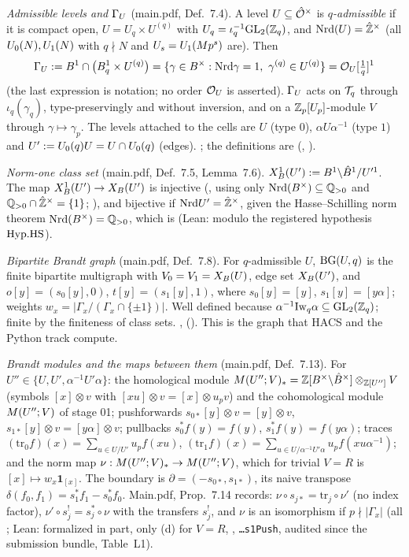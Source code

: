 \emph{Admissible levels and $\Gamma_U$} (main.pdf, Def.~7.4). A level $U\subseteq\hat{\mathcal{O}}^\times$ is \emph{$q$-admissible} if it is
compact open, $U=U_q\times U^{(q)}$ with $U_q=\iota_q^{-1}\mathrm{GL}_2(\mathbb{Z}_q)$, and $\mathrm{Nrd}(U)=\hat{\mathbb{Z}}^\times$ (all $U_0(N),U_1(N)$ with $q\nmid N$ and
$U_s=U_1(Mp^s)$ are). Then
\[\Gamma_U:=B^1\cap\big(B^1_q\times U^{(q)}\big)=\{\gamma\in B^\times:\mathrm{Nrd}\gamma=1,\ \gamma^{(q)}\in U^{(q)}\}=\mathcal{O}_U[\tfrac1q]^1\]
(the last expression is notation; no order $\mathcal{O}_U$ is asserted). $\Gamma_U$ acts on $\mathcal{T}_q$ through $\iota_q(\gamma_q)$, type-preservingly
and without inversion, and on a $\mathbb{Z}_p[U_p]$-module $V$ through $\gamma\mapsto\gamma_p$. The levels attached to the cells are $U$
(type $0$), $\alpha U\alpha^{-1}$ (type $1$) and $U':=U_0(q)U=U\cap U_0(q)$ (edges). \stproved; the definitions are \stformal{}
(, ).

\emph{Norm-one class set} (main.pdf, Def.~7.5, Lemma~7.6). $X^1_B(U'):=B^1\backslash\hat{B}^1/U'^1$. The map $X^1_B(U')\to X_B(U')$ is
injective (\stproved, using only $\mathrm{Nrd}(B^\times)\subseteq\mathbb{Q}_{>0}$ and $\mathbb{Q}_{>0}\cap\hat{\mathbb{Z}}^\times=\{1\}$; \stformal), and bijective if
$\mathrm{Nrd} U'=\hat{\mathbb{Z}}^\times$, given the Hasse--Schilling norm theorem $\mathrm{Nrd}(B^\times)=\mathbb{Q}_{>0}$, which is \stcited{}
\cite[Main Thm.~14.7.4, p.~234]{Vo} (Lean: \stformal{} modulo the registered hypothesis $\mathrm{Hyp.HS}$).

\emph{Bipartite Brandt graph} (main.pdf, Def.~7.8). For $q$-admissible $U$, $\mathrm{BG}(U,q)$ is the finite bipartite multigraph with
$V_0=V_1=X_B(U)$, edge set $X_B(U')$, and $o[y]=(s_0[y],0)$, $t[y]=(s_1[y],1)$, where $s_0[y]=[y]$, $s_1[y]=[y\alpha]$; weights
$w_x=|\Gamma_x/(\Gamma_x\cap\{\pm1\})|$. Well defined because $\alpha^{-1}\mathrm{Iw}_q\alpha\subseteq\mathrm{GL}_2(\mathbb{Z}_q)$; finite by the finiteness of class sets.
\stproved, \stformal{} (). This is the graph that HACS and the Python track compute.

\emph{Brandt modules and the maps between them} (main.pdf, Def.~7.13). For $U''\in\{U,U',\alpha^{-1}U'\alpha\}$:
the homological module $M(U'';V)_*=\mathbb{Z}[B^\times\backslash\hat{B}^\times]\otimes_{\mathbb{Z}[U'']}V$ (symbols $[x]\otimes v$ with $[xu]\otimes v=[x]\otimes u_pv$) and
the cohomological module $M(U'';V)$ of stage 01; pushforwards $s_{0*}[y]\otimes v=[y]\otimes v$, $s_{1*}[y]\otimes v=[y\alpha]\otimes v$;
pullbacks $s_0^*f(y)=f(y)$, $s_1^*f(y)=f(y\alpha)$; traces
$(\mathrm{tr}_0f)(x)=\sum_{u\in U/U'}u_pf(xu)$, $(\mathrm{tr}_1f)(x)=\sum_{u\in U/\alpha^{-1}U'\alpha}u_pf(xu\alpha^{-1})$; and the norm map
$\nu:M(U'';V)_*\to M(U'';V)$, which for trivial $V=R$ is $[x]\mapsto w_x\mathbf 1_{[x]}$. The boundary is
$\partial=(-s_{0*},s_{1*})$, its naive transpose $\delta(f_0,f_1)=s_1^*f_1-s_0^*f_0$. Main.pdf, Prop.~7.14 records:
$\nu\circ s_{j*}=\mathrm{tr}_j\circ\nu'$ (no index factor), $\nu'\circ s_j^!=s_j^*\circ\nu$ with the transfers $s_j^!$, and $\nu$ is an
isomorphism if $p\nmid|\Gamma_x|$ (all \stproved; Lean: formalized in part, only (d) for $V=R$, ,
\texttt{\dots s1Push}, audited since the submission bundle, Table~L1).

